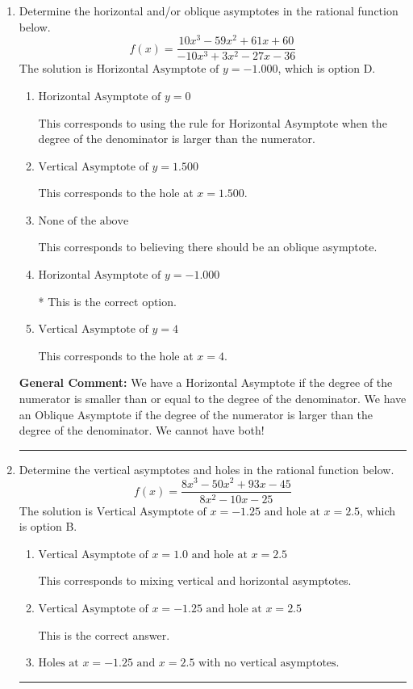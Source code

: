 \documentclass{extbook}[14pt]
\newcommand{\litem}[1]{\item #1

\rule{\textwidth}{0.4pt}}
\begin{document}
\begin{enumerate}\litem{
Determine the horizontal and/or oblique asymptotes in the rational function below.
\[ f(x) = \frac{10x^{3} -59 x^{2} +61 x + 60}{-10x^{3} +3 x^{2} -27 x -36} \]The solution is \( \text{Horizontal Asymptote of } y = -1.000  \), which is option D.\begin{enumerate}[label=\Alph*.]
\item \( \text{Horizontal Asymptote of } y = 0  \)

This corresponds to using the rule for Horizontal Asymptote when the degree of the denominator is larger than the numerator.
\item \( \text{Vertical Asymptote of } y = 1.500  \)

This corresponds to the hole at $x = 1.500$.
\item \( \text{None of the above} \)

This corresponds to believing there should be an oblique asymptote.
\item \( \text{Horizontal Asymptote of } y = -1.000  \)

* This is the correct option.
\item \( \text{Vertical Asymptote of } y = 4  \)

This corresponds to the hole at $x = 4$.
\end{enumerate}

\textbf{General Comment:} We have a Horizontal Asymptote if the degree of the numerator is smaller than or equal to the degree of the denominator. We have an Oblique Asymptote if the degree of the numerator is larger than the degree of the denominator. We cannot have both!
}
\litem{
Determine the vertical asymptotes and holes in the rational function below.
\[ f(x) = \frac{8x^{3} -50 x^{2} +93 x -45}{8x^{2} -10 x -25} \]The solution is \( \text{Vertical Asymptote of } x = -1.25 \text{ and hole at } x = 2.5 \), which is option B.\begin{enumerate}[label=\Alph*.]
\item \( \text{Vertical Asymptote of } x = 1.0 \text{ and hole at } x = 2.5 \)

This corresponds to mixing vertical and horizontal asymptotes.
\item \( \text{Vertical Asymptote of } x = -1.25 \text{ and hole at } x = 2.5 \)

This is the correct answer.
\item \( \text{Holes at } x = -1.25 \text{ and } x = 2.5 \text{ with no vertical asymptotes.} \)


\end{enumerate}}
\end{enumerate}
\end{document}
